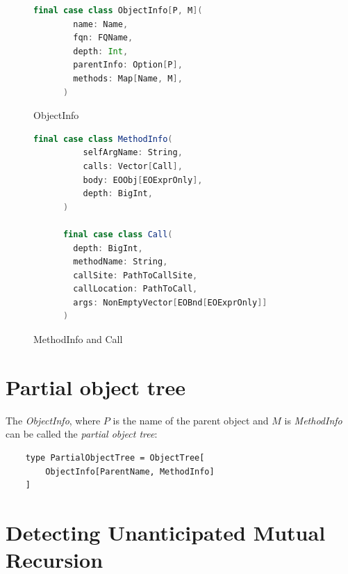 \begin{figure}
    \begin{lstlisting}[language=Scala]
      final case class ObjectInfo[P, M](
        name: Name,
        fqn: FQName,
        depth: Int,
        parentInfo: Option[P],
        methods: Map[Name, M],
      )
    \end{lstlisting}
    \caption{ObjectInfo}
    \label{fig:objinfo}
\end{figure}

\begin{figure}
    \begin{lstlisting}[language=Scala]
      final case class MethodInfo(
          selfArgName: String,
          calls: Vector[Call],
          body: EOObj[EOExprOnly],
          depth: BigInt,
      )
          
      final case class Call(
        depth: BigInt,
        methodName: String,
        callSite: PathToCallSite,
        callLocation: PathToCall,
        args: NonEmptyVector[EOBnd[EOExprOnly]]
      )
    \end{lstlisting}
    \caption{MethodInfo and Call}
    \label{fig:methodinfo}
\end{figure}

\section{Partial object tree}
The \textit{ObjectInfo}, where $P$ is the name of the parent object and $M$ is \textit{MethodInfo} can be called the \textit{partial object tree}:
\begin{lstlisting}
    type PartialObjectTree = ObjectTree[
        ObjectInfo[ParentName, MethodInfo]
    ]

\end{lstlisting} 



\section{Detecting Unanticipated Mutual Recursion}
\label{impl:mutualrec}

